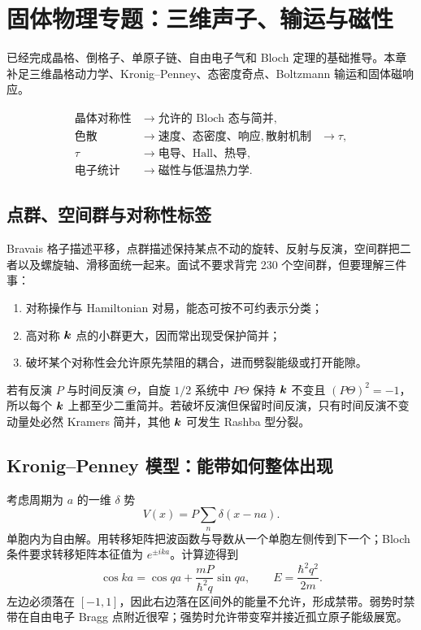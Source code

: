 \chapter{固体物理专题：三维声子、输运与磁性}

\begin{prereqbox}
已经完成晶格、倒格子、单原子链、自由电子气和 Bloch 定理的基础推导。本章补足三维晶格动力学、Kronig--Penney、态密度奇点、Boltzmann 输运和固体磁响应。
\end{prereqbox}
\begin{mapbox}
\[
\begin{aligned}
\text{晶体对称性}&\to\text{允许的 Bloch 态与简并},\\
\text{色散}&\to\text{速度、态密度、响应},
\text{散射机制}&\to\tau,\\
\tau&\to\text{电导、Hall、热导},\\
\text{电子统计}&\to\text{磁性与低温热力学}.
\end{aligned}
\]
\end{mapbox}

\section{点群、空间群与对称性标签}
Bravais 格子描述平移，点群描述保持某点不动的旋转、反射与反演，空间群把二者以及螺旋轴、滑移面统一起来。面试不要求背完 230 个空间群，但要理解三件事：
\begin{enumerate}
\item 对称操作与 Hamiltonian 对易，能态可按不可约表示分类；
\item 高对称 $\bm{k}$ 点的小群更大，因而常出现受保护简并；
\item 破坏某个对称性会允许原先禁阻的耦合，进而劈裂能级或打开能隙。
\end{enumerate}
若有反演 $P$ 与时间反演 $\Theta$，自旋 $1/2$ 系统中
$P\Theta$ 保持 $\bm{k}$ 不变且 $(P\Theta)^2=-1$，所以每个 $\bm{k}$ 上都至少二重简并。若破坏反演但保留时间反演，只有时间反演不变动量处必然 Kramers 简并，其他 $\bm{k}$ 可发生 Rashba 型分裂。

\section{Kronig--Penney 模型：能带如何整体出现}
考虑周期为 $a$ 的一维 $\delta$ 势
\[
V(x)=P\sum_n\delta(x-na).
\]
单胞内为自由解。用转移矩阵把波函数与导数从一个单胞左侧传到下一个；Bloch 条件要求转移矩阵本征值为 $e^{\pm ika}$。计算迹得到
\[
\boxed{\cos ka=\cos qa+\frac{mP}{\hbar^2q}\sin qa},
\qquad E=\frac{\hbar^2q^2}{2m}.
\]
左边必须落在 $[-1,1]$，因此右边落在区间外的能量不允许，形成禁带。弱势时禁带在自由电子 Bragg 点附近很窄；强势时允许带变窄并接近孤立原子能级展宽。

